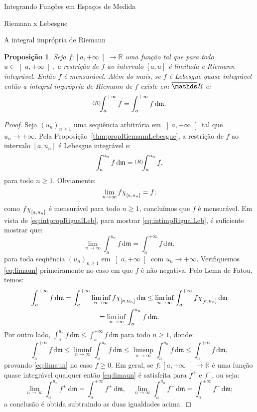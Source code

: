 \documentclass[oneside,final,11pt]{amsbook}
\newcommand{\R}{\mathds R}
\newcommand{\leb}{\mathfrak m}
\newcommand{\dd}{\mathrm d}
\newcommand{\chilow}[1]{\chi_{\lower2pt\hbox{$\scriptstyle#1$}}}
\newcommand{\intRd}{\raise2pt\hbox{$\scriptstyle(R)$}\!\!\int}
\theoremstyle{remark}\newtheorem{exercise}{Exercício}[chapter]
\theoremstyle{remark}\newtheorem{*exercise}[exercise]{\hbox to 0pt{\hskip 0pt minus 1fil*}Exercício}
\theoremstyle{definition}\newtheorem{exdefin}{Definição}[chapter]
\theoremstyle{plain}\newtheorem{teo}{Teorema}[section]
\theoremstyle{plain}\newtheorem{lem}[teo]{Lema}
\theoremstyle{plain}\newtheorem{prop}[teo]{Proposição}
\theoremstyle{plain}\newtheorem{cor}[teo]{Corolário}
\theoremstyle{definition}\newtheorem{defin}[teo]{Definição}
\theoremstyle{remark}\newtheorem{rem}[teo]{Observação}
\theoremstyle{definition}\newtheorem{notation}[teo]{Notação}
\theoremstyle{definition}\newtheorem{convention}[teo]{Convenção}
\theoremstyle{definition}\newtheorem{example}[teo]{Exemplo}
\numberwithin{section}{chapter}
\numberwithin{equation}{section}
\begin{document}
\begin{chapter}{Integrando Funções em Espaços de Medida}
\begin{section}{Riemann x Lebesgue}
\begin{subsection}{A integral imprópria de Riemann}
\begin{prop}\label{thm:RiemannimpLeb}
Seja $f:\left[a,+\infty\right[\to\R$ uma função tal que para todo $u\in\left]a,+\infty\right[$,
a restrição de $f$ ao intervalo $[a,u]$ é limitada e Riemann integrável. Então $f$ é mensurável.
Além do mais, se $f$ é Lebesgue quase integrável então a integral
imprópria de Riemann de $f$ existe em $\overline\R$ e:
\begin{equation}\label{eq:intimpRigualLeb}
\intRd_a^{+\infty}f=\int_a^{+\infty}f\,\dd\leb.
\end{equation}
\end{prop}
\begin{proof}
Seja $(u_n)_{n\ge1}$ uma seqüência arbitrária em $\left]a,+\infty\right[$ tal que
$u_n\to+\infty$. Pela Proposição~\ref{thm:propRiemannLebesgue}, a restrição de $f$
ao intervalo $[a,u_n]$ é Lebesgue integrável e:
\begin{equation}\label{eq:intpropRigualLeb}
\int_a^{u_n}f\,\dd\leb=\intRd_a^{u_n}f,
\end{equation}
para todo $n\ge1$. Obviamente:
\[\lim_{n\to\infty}f\chilow{[a,u_n]}=f;\]
como $f\chilow{[a,u_n]}$ é mensurável para todo $n\ge1$,
concluímos que $f$ é mensurável. Em vista de \eqref{eq:intpropRigualLeb}, para mostrar
\eqref{eq:intimpRigualLeb}, é suficiente mostrar que:
\begin{equation}\label{eq:limaun}
\lim_{n\to\infty}\int_a^{u_n}f\,\dd\leb=\int_a^{+\infty}f\,\dd\leb,
\end{equation}
para toda seqüência $(u_n)_{n\ge1}$ em $\left]a,+\infty\right[$ com $u_n\to+\infty$.
Verifiquemos \eqref{eq:limaun} primeiramente no caso em que $f$ é não negativa. Pelo Lema
de Fatou, temos:
\begin{multline*}
\int_a^{+\infty}f\,\dd\leb=
\int_a^{+\infty}\liminf_{n\to\infty}f\chilow{[a,u_n]}\,\dd\leb\le
\liminf_{n\to\infty}\int_a^{+\infty}f\chilow{[a,u_n]}\,\dd\leb
\\=\liminf_{n\to\infty}\int_a^{u_n}f\,\dd\leb.
\end{multline*}
Por outro lado, $\int_a^{u_n}f\,\dd\leb\le\int_a^{+\infty}f\,\dd\leb$
para todo $n\ge1$, donde:
\[\int_a^{+\infty}f\,\dd\leb\le\liminf_{n\to\infty}\int_a^{u_n}f\,\dd\leb\le
\limsup_{n\to\infty}\int_a^{u_n}f\,\dd\leb\le\int_a^{+\infty}f\,\dd\leb,\]
provando \eqref{eq:limaun} no caso $f\ge0$. Em geral, se $f:\left[a,+\infty\right[\to\R$ é uma função quase integrável
qualquer então \eqref{eq:limaun} é satisfeita para $f^+$ e $f^-$, ou seja:
\[\lim_{n\to\infty}\int_a^{u_n}f^+\,\dd\leb=\int_a^{+\infty}f^+\,\dd\leb,\quad
\lim_{n\to\infty}\int_a^{u_n}f^-\,\dd\leb=\int_a^{+\infty}f^-\,\dd\leb;\]
a conclusão é obtida subtraindo as duas igualdades acima.
\end{proof}


\end{subsection}
\end{section}
\end{chapter}
\end{document}
